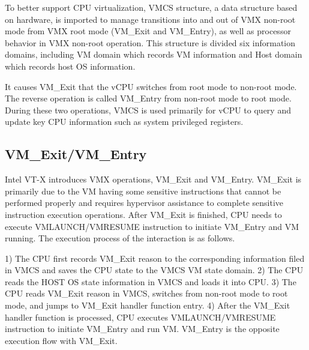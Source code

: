 \documentclass[conference]{IEEEtran}
\begin{document}
To better support CPU virtualization, VMCS structure, a data structure based on hardware, is imported to manage transitions into and out of VMX non-root mode from VMX root mode (VM\_Exit and VM\_Entry), as well as processor behavior in VMX non-root operation.
This structure is divided six information domains, including VM domain which records VM information and Host domain which records host OS information.


It causes VM\_Exit that the vCPU switches from root mode to non-root mode. The reverse operation is called VM\_Entry from non-root mode to root mode. During these two operations, VMCS is used primarily for vCPU to query and update key CPU information such as system privileged registers.

%
\subsection{VM\_Exit/VM\_Entry}
Intel VT-X introduces VMX operations, VM\_Exit and VM\_Entry. VM\_Exit is primarily due to the VM having some sensitive instructions that cannot be performed properly and requires hypervisor assistance to complete sensitive instruction execution operations. After VM\_Exit is finished, CPU needs to execute VMLAUNCH/VMRESUME instruction to initiate VM\_Entry and VM running. The execution process of the interaction is as follows. 


1) The CPU first records VM\_Exit reason to the corresponding information filed in VMCS and saves the CPU state to the VMCS VM state domain.
2) The CPU reads the HOST OS state information in VMCS and loads it into CPU.
3) The CPU reads VM\_Exit reason in VMCS, switches from non-root mode to root mode, and jumps to VM\_Exit handler function entry.
4) After the VM\_Exit handler function is processed, CPU executes VMLAUNCH/VMRESUME instruction to initiate VM\_Entry and run VM.
VM\_Entry is the opposite execution flow with VM\_Exit.
\end{document}
